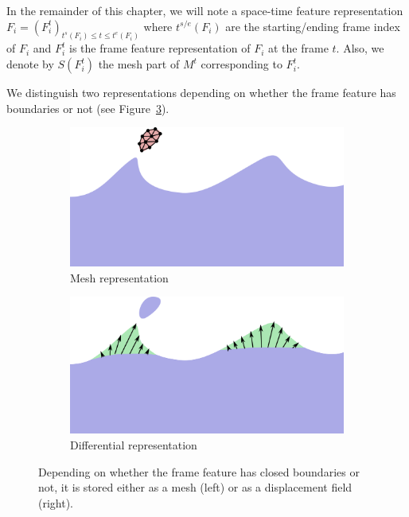 In the remainder of this chapter, we will note a space-time feature representation $F_{i} = \left( F_{i}^{t} \right)_{t^{s}\left(F_{i}\right) \leq t \leq t^{e}\left(F_{i}\right)}$ where $t^{s/e}(F_{i})$ are the starting/ending frame index of $F_{i}$ and $F_{i}^{t}$ is the frame feature representation of $F_{i}$ at the frame $t$. 
Also, we denote by $S(F_{i}^{t})$ the mesh part of $M^{t}$ corresponding to $F_{i}^{t}$.

We distinguish two representations depending on whether the frame feature has boundaries or not (see Figure~\ref{fig:feature_representation}). 
\begin{figure}[h!]
	\centering
	\label{fig:featureRepresentation}
	\begin{subfigure}[b]{0.46\linewidth}
		\centering
		\includegraphics[width=\textwidth]{images/fluidsculpting-mig2016/isolatedFeature.png}
		\caption{\label{fig:feature_representation:mesh}Mesh representation}
	\end{subfigure}
	\hspace{0.1cm}
	\begin{subfigure}[b]{0.46\linewidth}
		\centering
		\includegraphics[width=\textwidth]{images/fluidsculpting-mig2016/detailFeature.png}
		\caption{\label{fig:feature_representation:displacement}Differential representation}
	\end{subfigure}
	\caption[Fluid sculpting: Feature representation]{
		Depending on whether the frame feature has closed boundaries or not, it is stored either as a mesh (left) or as a displacement field (right).}
	\label{fig:feature_representation}
\end{figure}
